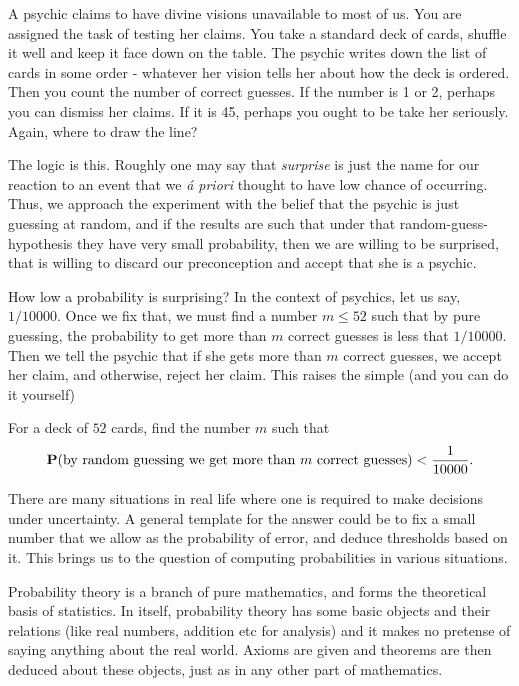 \documentclass[preprint,  11pt]{amsart}
\begin{document}
\beg A psychic claims to have divine visions unavailable to most of us. You are assigned the task of testing her claims. You take a standard deck of cards, shuffle it well and keep it face down on the table. The psychic writes down the list of cards in some order - whatever her vision tells her about how the deck is ordered. Then you count the number of correct guesses. If the number is 1 or 2, perhaps you can dismiss her claims. If it is 45, perhaps you ought to be take her seriously. Again, where to draw the line?

The logic is this. Roughly one may say that {\em surprise} is just the name for our reaction to an event that we {\em \'{a} priori} thought to have low chance of occurring. Thus, we approach the experiment with the belief that the psychic is just guessing at random, and if the results are such that under that random-guess-hypothesis they have very small probability, then we are willing to be surprised, that is willing to discard our preconception and accept that she is a psychic.

How low a probability is surprising? In the context of psychics, let us say, $1/10000$. Once we fix that, we must find a number $m\le 52$ such that by pure guessing, the probability to get more than $m$ correct guesses is less that $1/10000$. Then we tell the psychic that if she gets more than $m$ correct guesses, we accept her claim, and otherwise, reject her claim.  This raises the simple (and you can do it yourself)
\begin{question} For a deck of $52$ cards, find the number $m$ such that
$$
\mathbf{P}(\mbox{by random guessing we get more than }m\mbox{ correct guesses})<\frac{1}{10000}.
$$
\end{question}
\eeg


 There are many situations in real life where one is required to make decisions under uncertainty. A general template for the answer could be to fix a small number that we allow as the probability of error, and deduce thresholds based on it. This brings us to the question of computing probabilities in various situations.



\vspace{4mm}
 Probability theory is a branch of pure mathematics, and forms the theoretical basis of statistics. In itself, probability theory has some basic objects and their relations (like real numbers, addition etc for analysis) and it makes no pretense of saying anything about the real world. Axioms are given and theorems are then deduced about these objects, just as in any other part of mathematics.
\end{document}
